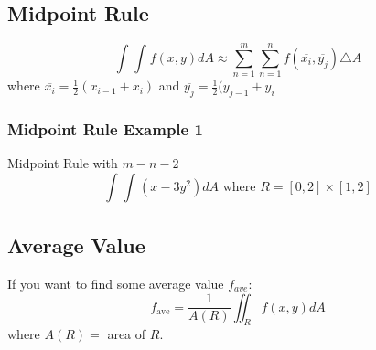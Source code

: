 \documentclass[12pt]{article}
\begin{document}
\subsection{Midpoint Rule}
\[
	\int_{}^{} \int_{}^{} f(x,y)dA \approx \sum_{n=1}^{m} \sum_{n=1}^{n} f(\overline{x_i}, \overline{y_j})\triangle A
\]
where \(\overline{x_i} = \frac{1}{2}(x_{i-1} + x_i)	\) and \(\overline{y_j} = \frac{1}{2}(y_{j-1} + y_i	\)

\subsubsection{Midpoint Rule Example 1	}
Midpoint Rule with \(m-n-2\)
\[
	\int_{}^{} \int_{}^{} (x - 3y^2)dA \text{ where } R = [0,2] \times [1,2]
\]

\subsection{Average Value}
If you want to find some average value \(f_{ave}\):
\[
	f_{\text{ave}} = \frac{1}{A(R)} \iint_{R}f(x,y)dA
\]
where \(A(R) = \) area of \(R\).
\end{document}
